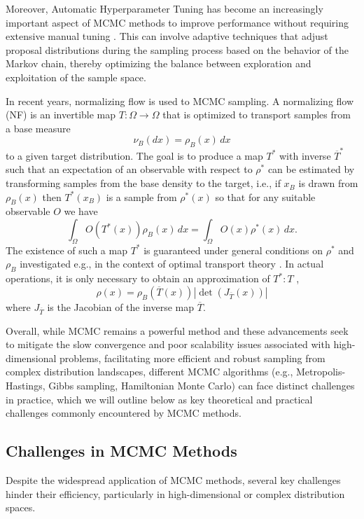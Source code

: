 \documentclass[twocolumn]{article}
\begin{document}
Moreover, Automatic Hyperparameter Tuning has become an increasingly important aspect of MCMC methods to improve performance without requiring extensive manual tuning \cite{hoffman2014no}. This can involve adaptive techniques that adjust proposal distributions during the sampling process based on the behavior of the Markov chain, thereby optimizing the balance between exploration and exploitation of the sample space.

In recent years, normalizing flow is used to MCMC sampling. A normalizing flow (NF) is an invertible map $T : \Omega \to \Omega$ that is optimized to transport samples from a base measure $$\nu_B(dx) = \rho_B(x) \, dx$$ to a given target distribution. The goal is to produce a map $T^*$ with inverse $\overline{T}^*$ such that an expectation of an observable with respect to $\rho^*$ can be estimated by transforming samples from the base density to the target, i.e., if $x_B$ is drawn from $\rho_B(x)$ then $T^*(x_B)$ is a sample from $\rho^*(x)$ so that for any suitable observable $O$ we have
$$
\int_\Omega O(T^*(x))\rho_B(x)\, dx = \int_\Omega O(x)\rho^*(x)\, dx. 
$$
The existence of such a map $T^*$ is guaranteed under general conditions on $\rho^*$ and $\rho_B$ investigated e.g., in the context of optimal transport theory \cite{Villani2003,Santambrogio2015}. In actual operations, it is only necessary to obtain an approximation of $T^*: T$ \cite{Andral2024CombiningNF,Gabrie2021AdaptiveMC},
$$
\hat{\rho}(x) = \rho_B(\overline{T}(x)) \left| \det(J_{\overline{T}}(x)) \right|
$$ where $J_{\overline{T}}$ is the Jacobian of the inverse map $\overline{T}$. 

Overall, while MCMC remains a powerful method and these advancements seek to mitigate the slow convergence and poor scalability issues associated with high-dimensional problems, facilitating more efficient and robust sampling from complex distribution landscapes, different MCMC algorithms (e.g., Metropolis-Hastings, Gibbs sampling, Hamiltonian Monte Carlo) \cite{gilks1996markov} can face distinct challenges in practice, which we will outline below as key theoretical and practical challenges commonly encountered by MCMC methods.



\subsection{Challenges in MCMC Methods}

Despite the widespread application of MCMC methods, several key challenges hinder their efficiency, particularly in high-dimensional or complex distribution spaces.
\end{document}
